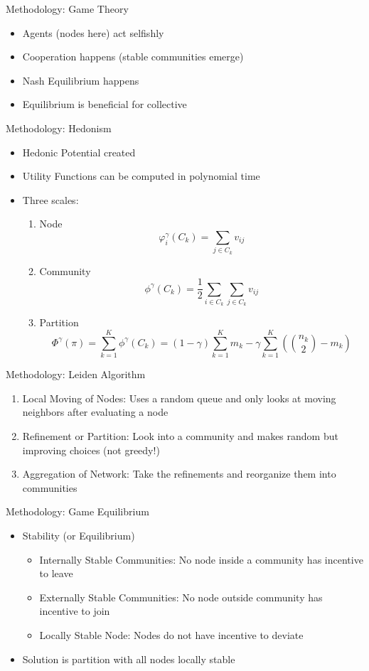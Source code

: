\documentclass[xcolor=pdftex,dvipsnames,table]{beamer}
\begin{document}
\begin{frame}{Methodology:  Game Theory}
\begin{itemize}
\item Agents (nodes here) act selfishly
\item Cooperation happens (stable communities emerge)
\item Nash Equilibrium happens
\item Equilibrium is beneficial for collective
\end{itemize}
\end{frame}
\begin{frame}{Methodology:  Hedonism}
\begin{itemize}
\item Hedonic Potential created
\item Utility Functions can be computed in polynomial time
\item Three scales:
\begin{enumerate}
\item Node
\[
\varphi^\gamma_i\left(C_k\right) = \sum_{j\in C_k}v_{ij}
\]
\item Community
\[
\phi^\gamma\left(C_k\right) = \frac12\sum_{i\in C_k}\sum_{j\in C_k}v_{ij}
\]
\item Partition
\[
\Phi^\gamma(\pi) = \sum_{k=1}^K\phi^{\gamma}\left(C_k\right) = \left(1-\gamma\right)\sum_{k=1}^K m_k - \gamma\sum_{k=1}^K\left(\binom{n_k}2 - m_k\right)
\]
\end{enumerate}
\end{itemize}
\end{frame}

\begin{frame}{Methodology:  Leiden Algorithm}
\begin{enumerate}
\item Local Moving of Nodes:  Uses a random queue and only looks at moving neighbors after evaluating a node
\item Refinement or Partition:  Look into a community and makes random but improving choices (not greedy!)
\item Aggregation of Network:  Take the refinements and reorganize them into communities  
\end{enumerate}
\end{frame}

\begin{frame}{Methodology:  Game Equilibrium}
\begin{itemize}
\item Stability (or Equilibrium)
\begin{itemize}
\item Internally Stable Communities:  No node inside a community has incentive to leave
\item Externally Stable Communities:  No node outside community has incentive to join
\item Locally Stable Node: Nodes do not have incentive to deviate
\end{itemize}
\item Solution is partition with all nodes locally stable
\end{itemize}
\end{frame}
 
\end{document}
